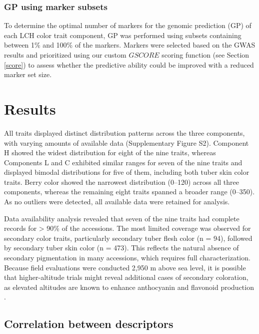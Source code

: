 \documentclass[pdflatex,sn-mathphys-ay]{sn-jnl}%
\begin{document}
\subsubsection{GP using marker subsets}


To determine the optimal number of markers for the genomic prediction (GP) of each LCH color trait component, GP was performed using subsets containing between 1\% and 100\% of the markers. Markers were selected based on the GWAS results and prioritized using our custom $GSCORE$ scoring function (see Section \ref{score}) to assess whether the predictive ability could be improved with a reduced marker set size.


\section{Results}



All traits displayed distinct distribution patterns across the three components, with varying amounts of available data (Supplementary Figure S2). Component H showed the widest distribution for eight of the nine traits, whereas Components L and C exhibited similar ranges for seven of the nine traits and displayed bimodal distributions for five of them, including both tuber skin color traits. Berry color showed the narrowest distribution (0–120) across all three components, whereas the remaining eight traits spanned a broader range (0–350). As no outliers were detected, all available data were retained for analysis.


Data availability analysis revealed that seven of the nine traits had complete records for > 90\% of the accessions.  The most limited coverage was observed for secondary color traits, particularly secondary tuber flesh color (n = 94), followed by secondary tuber skin color (n = 473). This reflects the natural absence of secondary pigmentation in many accessions, which requires full characterization. Because field evaluations were conducted 2,950 m above sea level, it is possible that higher-altitude trials might reveal additional cases of secondary coloration, as elevated altitudes are known to enhance anthocyanin and flavonoid production \citep{qi2023anthocyanin,flavonoids}.




\subsection{Correlation between descriptors}
\end{document}
